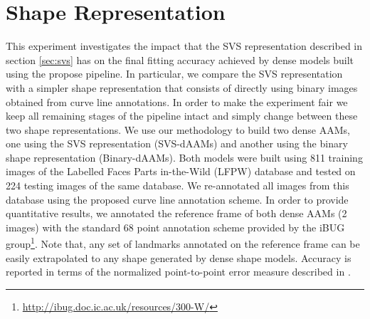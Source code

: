 

\section{Shape Representation}
\label{exp:svs}

This experiment investigates the impact that the SVS representation described in section \ref{sec:svs} has on the final fitting accuracy achieved by dense models built using the propose pipeline. In particular, we compare the SVS representation with a simpler shape representation that consists of directly using binary images obtained from curve line annotations. In order to make the experiment fair we keep all remaining stages of the pipeline intact and simply change between these two shape representations. We use our methodology to build two dense AAMs, one using the SVS representation (SVS-dAAMs) and another using the binary shape representation (Binary-dAAMs). Both models were built using 811 training images of the Labelled Faces Parts in-the-Wild (LFPW) \cite{Belhumeur2011} database and tested on 224 testing images of the same database. We re-annotated all images from this database using the proposed curve line annotation scheme. In order to provide quantitative results, we annotated the reference frame of both dense AAMs (2 images) with the standard 68 point annotation scheme provided by the iBUG group\footnote{\label{ibug_300} \url{http://ibug.doc.ic.ac.uk/resources/300-W/}}. Note that, any set of landmarks annotated on the reference frame can be easily extrapolated to any shape generated by dense shape models.
Accuracy is reported in terms of the normalized point-to-point error measure described in \cite{Zhu2012}.

